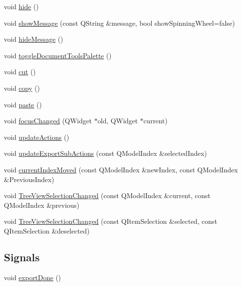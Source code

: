 \begin{DoxyCompactItemize}
void \hyperlink{class_u_b_document_controller_a258e79e470661b84b0169e37af61bf39}{hide} ()
\item 
void \hyperlink{class_u_b_document_controller_aa5a4bf5ad86548cda5fd75ce6eb9f28f}{show\-Message} (const Q\-String \&message, bool show\-Spinning\-Wheel=false)
\item 
void \hyperlink{class_u_b_document_controller_a73b29c9fcfc83397a6bd30af5fdc1ed2}{hide\-Message} ()
\item 
void \hyperlink{class_u_b_document_controller_afc7d15a8ac67eebe5f3c5b55dc4798ff}{toggle\-Document\-Tools\-Palette} ()
\item 
void \hyperlink{class_u_b_document_controller_a31460063c9fda27178d3583cc756335e}{cut} ()
\item 
void \hyperlink{class_u_b_document_controller_a99fde88386c6f2f0d2909dc9fb1fde45}{copy} ()
\item 
void \hyperlink{class_u_b_document_controller_a0af787e5158abf66d502d872e4417d46}{paste} ()
\item 
void \hyperlink{class_u_b_document_controller_aa70db6b7dd1728a18683312b3f410c9e}{focus\-Changed} (Q\-Widget $\ast$old, Q\-Widget $\ast$current)
\item 
void \hyperlink{class_u_b_document_controller_afa1658f058c031b3ecb4755e0b3a7216}{update\-Actions} ()
\item 
void \hyperlink{class_u_b_document_controller_a5968cbb380181f80a10d1df9baec17de}{update\-Export\-Sub\-Actions} (const Q\-Model\-Index \&selected\-Index)
\item 
void \hyperlink{class_u_b_document_controller_a31c133ed208c58832912aedd8cf094c1}{current\-Index\-Moved} (const Q\-Model\-Index \&new\-Index, const Q\-Model\-Index \&Previous\-Index)
\item 
void \hyperlink{class_u_b_document_controller_a36a841a4f05c184f0f9e9a8806f804db}{Tree\-View\-Selection\-Changed} (const Q\-Model\-Index \&current, const Q\-Model\-Index \&previous)
\item 
void \hyperlink{class_u_b_document_controller_a352821e8f64af5a796be4b70da70a0ef}{Tree\-View\-Selection\-Changed} (const Q\-Item\-Selection \&selected, const Q\-Item\-Selection \&deselected)
\end{DoxyCompactItemize}
\subsection*{Signals}
\begin{DoxyCompactItemize}
\item 
void \hyperlink{class_u_b_document_controller_a9a8566626019075851d06ad155882452}{export\-Done} ()
\end{DoxyCompactItemize}
